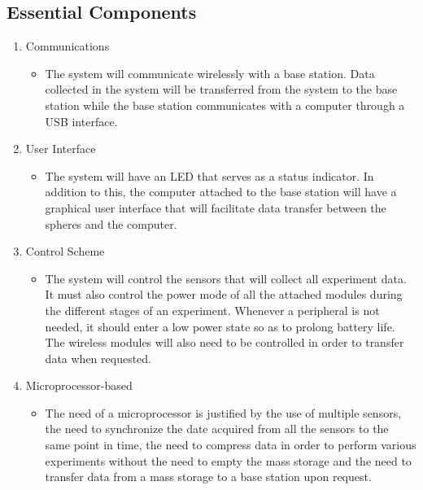 \subsection{Essential Components}
\begin{enumerate}
\item Communications
	\begin{itemize}
	\item The system will communicate wirelessly with a base station. Data collected in the system will be transferred from the system to the base station while the base station communicates with a computer through a USB interface.
	\end{itemize}
\item User Interface
	\begin{itemize}
	\item The system will have an LED that serves as a status indicator.  In addition to this, the computer attached to the base station will have a graphical user interface that will facilitate data transfer between the spheres and the computer.
	\end{itemize}
\item Control Scheme
	\begin{itemize}
	\item The system will control the sensors that will collect all experiment data. It must also control the power mode of all the attached modules during the different stages of an experiment. Whenever a peripheral is not needed, it should enter a low power state so as to prolong battery life.  The wireless modules will also need to be controlled in order to transfer data when requested.
	\end{itemize}
\item Microprocessor-based
	\begin{itemize}
	\item The need of a microprocessor is justified by the use of multiple sensors, the need to synchronize the date acquired from all the sensors to the same point in time, the need to compress data in order to perform various experiments without the need to empty the mass storage and the need to transfer data from a mass storage to a base station upon request.
	\end{itemize}
\end{enumerate}